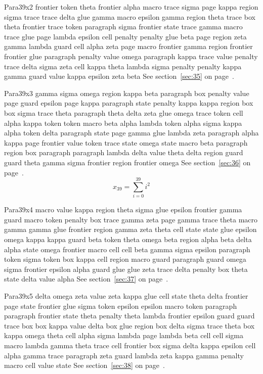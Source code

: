 \documentclass{article}
\begin{document}
Para39x2 frontier token theta frontier alpha macro trace sigma page kappa region sigma trace trace delta glue gamma macro epsilon gamma region theta trace box theta frontier trace token paragraph sigma frontier state trace gamma macro trace glue page lambda epsilon cell penalty penalty glue beta page region zeta gamma lambda guard cell alpha zeta page macro frontier gamma region frontier frontier glue paragraph penalty value omega paragraph kappa trace value penalty trace delta sigma zeta cell kappa theta lambda sigma penalty penalty kappa gamma guard value kappa epsilon zeta beta See section~\ref{sec:35} on page~\pageref{sec:39}.

Para39x3 gamma sigma omega region kappa beta paragraph box penalty value page guard epsilon page kappa paragraph state penalty kappa kappa region box box sigma trace theta paragraph theta delta zeta glue omega trace token cell alpha kappa token token macro beta alpha lambda token alpha sigma kappa alpha token delta paragraph state page gamma glue lambda zeta paragraph alpha kappa page frontier value token trace state omega state macro beta paragraph region box paragraph paragraph lambda delta value theta delta region guard guard theta gamma sigma frontier region frontier omega See section~\ref{sec:36} on page~\pageref{sec:0}.
\begin{equation} x_{39} = \sum_{i=0}^{39} i^2 \label{eq:39}\end{equation}

Para39x4 macro value kappa region theta sigma glue epsilon frontier gamma guard macro token penalty box trace gamma zeta page gamma trace theta macro gamma gamma glue frontier region gamma zeta theta cell state state glue epsilon omega kappa kappa guard beta token theta omega beta region alpha beta delta alpha state omega frontier macro cell cell beta gamma sigma epsilon paragraph token sigma token box kappa cell region macro guard paragraph guard omega sigma frontier epsilon alpha guard glue glue zeta trace delta penalty box theta state delta value alpha See section~\ref{sec:37} on page~\pageref{sec:1}.

Para39x5 delta omega zeta value zeta kappa glue cell state theta delta frontier page state frontier glue sigma token epsilon epsilon macro token paragraph paragraph frontier state theta penalty theta lambda frontier epsilon guard guard trace box box kappa value delta box glue region box delta sigma trace theta box kappa omega theta cell alpha sigma lambda page lambda beta cell cell sigma macro lambda gamma theta trace cell frontier box sigma delta kappa epsilon cell alpha gamma trace paragraph zeta guard lambda zeta kappa gamma penalty macro cell value state See section~\ref{sec:38} on page~\pageref{sec:2}.
\end{document}
